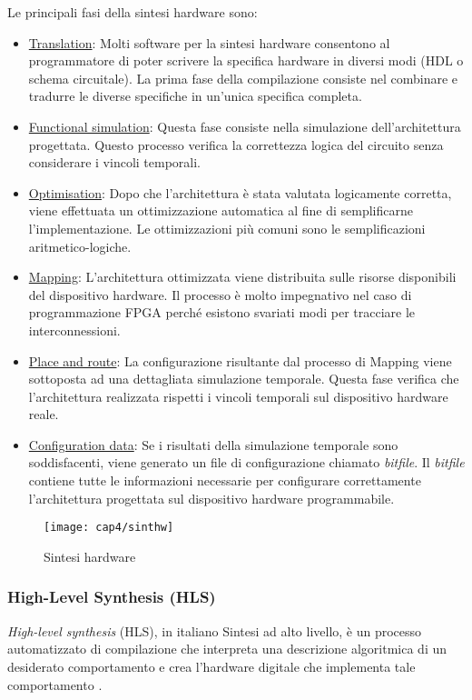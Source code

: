 Le principali fasi della sintesi hardware sono:
\begin{itemize}
	\item \underline{Translation}: Molti software per la sintesi hardware consentono al programmatore di poter scrivere la specifica hardware in diversi modi (HDL o schema circuitale). La prima fase della compilazione consiste nel combinare e tradurre le diverse specifiche in un'unica specifica completa.
	\item \underline{Functional simulation}: Questa fase consiste nella simulazione dell'architettura progettata. Questo processo verifica la correttezza logica del circuito senza considerare i vincoli temporali.
	\item \underline{Optimisation}: Dopo che l'architettura è stata valutata logicamente corretta, viene effettuata un ottimizzazione automatica al fine di semplificarne l'implementazione. Le ottimizzazioni più comuni sono le semplificazioni aritmetico-logiche.
	\item \underline{Mapping}: L'architettura ottimizzata viene distribuita sulle risorse disponibili del dispositivo hardware. Il processo è molto impegnativo nel caso di programmazione FPGA perché esistono svariati modi per tracciare le interconnessioni.
	\item \underline{Place and route}: La configurazione risultante dal processo di Mapping viene sottoposta ad una dettagliata simulazione temporale. Questa fase verifica che l'architettura realizzata rispetti i vincoli temporali sul dispositivo hardware reale.
	\item \underline{Configuration data}: Se i risultati della simulazione temporale sono soddisfacenti, viene generato un file di configurazione chiamato \textit{bitfile}. Il \textit{bitfile} contiene tutte le informazioni necessarie per configurare correttamente l'architettura progettata sul dispositivo hardware programmabile.
\end{itemize}

\begin{figure}  
  \begin{center}
    \texttt{[image: cap4/sinthw]}
    \caption{Sintesi hardware}
  \end{center}
\end{figure}
		
\subsubsection{High-Level Synthesis (HLS)}
\textit{High-level synthesis} (HLS), in italiano Sintesi ad alto livello, è un processo automatizzato di compilazione che interpreta una descrizione algoritmica di un desiderato comportamento e crea l'hardware digitale che implementa tale comportamento \cite{Coussy:2008:HSA:1457713}.

